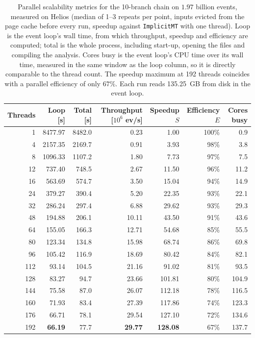 \begin{table}[htbp]
\centering
\caption{Parallel scalability metrics for the 10-branch chain on $1.97$ billion events, measured on Helios (median of 1--3 repeats per point, inputs evicted from the page cache before every run, speedup against \texttt{ImplicitMT} with one thread). Loop is the event loop's wall time, from which throughput, speedup and efficiency are computed; total is the whole process, including start-up, opening the files and compiling the analysis. Cores busy is the event loop's CPU time over its wall time, measured in the same window as the loop column, so it is directly comparable to the thread count. The speedup maximum at 192 threads coincides with a parallel efficiency of only $67\%$. Each run reads 135.25~GB from disk in the event loop.}
\label{tab:scalability-chain11}
\setlength{\tabcolsep}{5pt}
\begin{tabular}{rrrrrrr}
\toprule
Threads & Loop [s] & Total [s] & Throughput [$10^6$ ev/s] & Speedup $S$ & Efficiency $E$ & Cores busy \\
\midrule
 1 & 8477.97 & 8482.0 & 0.23 & 1.00 & 100\% & 0.9 \\
 4 & 2157.35 & 2169.7 & 0.91 & 3.93 & 98\% & 3.8 \\
 8 & 1096.33 & 1107.2 & 1.80 & 7.73 & 97\% & 7.5 \\
12 & 737.40 & 748.5 & 2.67 & 11.50 & 96\% & 11.2 \\
16 & 563.69 & 574.7 & 3.50 & 15.04 & 94\% & 14.9 \\
24 & 379.27 & 390.4 & 5.20 & 22.35 & 93\% & 22.1 \\
32 & 286.24 & 297.4 & 6.88 & 29.62 & 93\% & 29.3 \\
48 & 194.88 & 206.1 & 10.11 & 43.50 & 91\% & 43.6 \\
64 & 155.05 & 166.3 & 12.71 & 54.68 & 85\% & 55.5 \\
80 & 123.34 & 134.8 & 15.98 & 68.74 & 86\% & 69.8 \\
96 & 105.42 & 116.9 & 18.69 & 80.42 & 84\% & 82.1 \\
112 & 93.14 & 104.5 & 21.16 & 91.02 & 81\% & 93.5 \\
128 & 83.27 & 94.7 & 23.66 & 101.81 & 80\% & 104.9 \\
144 & 75.58 & 87.0 & 26.07 & 112.18 & 78\% & 116.5 \\
160 & 71.93 & 83.4 & 27.39 & 117.86 & 74\% & 123.3 \\
176 & 66.71 & 78.1 & 29.54 & 127.10 & 72\% & 134.6 \\
192 & \textbf{66.19} & 77.7 & \textbf{29.77} & \textbf{128.08} & 67\% & 137.7 \\
\bottomrule
\end{tabular}
\end{table}
